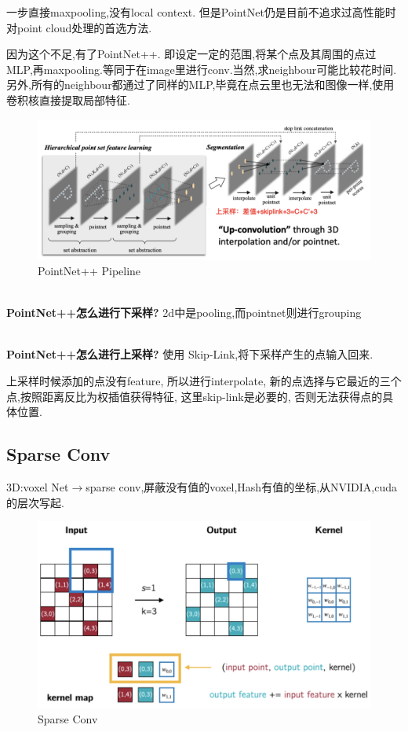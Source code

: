 一步直接maxpooling,没有local context.
但是PointNet仍是目前不追求过高性能时对point cloud处理的首选方法.

因为这个不足,有了PointNet++.
即设定一定的范围,将某个点及其周围的点过MLP,再maxpooling.等同于在image里进行conv.当然,求neighbour可能比较花时间.
另外,所有的neighbour都通过了同样的MLP,毕竟在点云里也无法和图像一样,使用卷积核直接提取局部特征.

\begin{figure}[htbp]
    \centering
    \includegraphics[scale=0.2]{figures/pointnet++.png}
    \caption{PointNet++ Pipeline}
\end{figure}

\textbf{\\PointNet++怎么进行下采样?} 2d中是pooling,而pointnet则进行grouping

\textbf{\\PointNet++怎么进行上采样?}
使用 Skip-Link,将下采样产生的点输入回来.

上采样时候添加的点没有feature, 所以进行interpolate,
新的点选择与它最近的三个点,按照距离反比为权插值获得特征, 这里skip-link是必要的, 否则无法获得点的具体位置.

\subsection{Sparse Conv}

3D:voxel Net$\rightarrow$sparse conv,屏蔽没有值的voxel,Hash有值的坐标,从NVIDIA,cuda的层次写起.

\begin{figure}[H]
    \centering
    \includegraphics[scale=0.2]{figures/sparsenet.png}
    \caption{Sparse Conv}
    \label{fig:sparsenet}
\end{figure}

